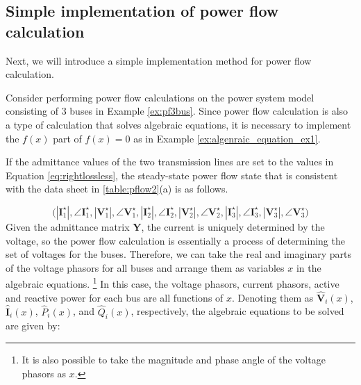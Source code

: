 \documentclass[graybox, envcountchap]{svmult}
\begin{document}
\subsection{Simple implementation of power flow calculation}

Next, we will introduce a simple implementation method for power flow
calculation.

\begin{example}\label{ex:simplepowerflow}
Consider performing power flow calculations on the power system model consisting
of 3 buses in Example \ref{ex:pf3bus}. Since power flow calculation is also a
type of calculation that solves algebraic equations, it is necessary to
implement the $f(x)$ part of $f(x)=0$ as in Example
\ref{ex:algenraic_equation_ex1}.

If the admittance values of the two transmission lines are set to the values in
Equation \ref{eq:rightlossless}, the steady-state power flow state that is
consistent with the data sheet in \ref{table:pflow2}(a) is as follows.

\[
\bigl(
|\bm{I}_1^{\star}|,\angle \bm{I}_1^{\star},
|\bm{V}_1^{\star}|,\angle \bm{V}_1^{\star},
|\bm{I}_2^{\star}|,\angle \bm{I}_2^{\star},
|\bm{V}_2^{\star}|,\angle \bm{V}_2^{\star},
|\bm{I}_3^{\star}|,\angle \bm{I}_3^{\star},
|\bm{V}_3^{\star}|,\angle \bm{V}_3^{\star}
\bigr)
\]
Given the admittance matrix $\bm Y$, the current is uniquely determined by the
voltage, so the power flow calculation is essentially a process of determining
the set of voltages for the buses. Therefore, we can take the real and imaginary
parts of the voltage phasors for all buses and arrange them as variables $x$ in
the algebraic equations. \footnote{It is also possible to take the magnitude and
phase angle of the voltage phasors as $x$.} In this case, the voltage phasors,
current phasors, active and reactive power for each bus are all functions of
$x$. Denoting them as $\hat{\bm V}_i(x)$, $\hat{\bm I}_i(x)$, $\hat{P}_i(x)$,
and $\hat{Q}_i(x)$, respectively, the algebraic equations to be solved are given
by:


\end{example}
\end{document}

